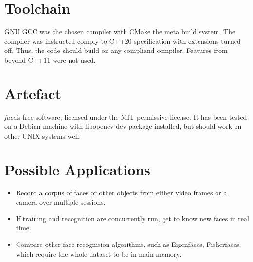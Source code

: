 \documentclass{article}
\newcommand{\face}[0]{\textit{face}}
\begin{document}
\section{Toolchain}
GNU GCC was the chosen compiler with CMake the meta build system.
The compiler was instructed comply to C++20 specification with extensions turned off.
Thus, the code should build on any compliand compiler.
Features from beyond C++11 were not used.


\section{Artefact}
\face is free software, licensed under the MIT permissive license.
It has been tested on a Debian machine with libopencv-dev package installed, but should work on other UNIX systems well. 


\section{Possible Applications}
\begin{itemize}
    \item{Record a corpus of faces or other objects from either video frames or a camera over multiple sessions.}
    \item{If training and recognition are concurrently run, get to know new faces in real time.}
    \item{Compare other face recognision algorithms, such as Eigenfaces, Fisherfaces, which require the whole dataset to be in main memory.}
\end{itemize}
\end{document}
